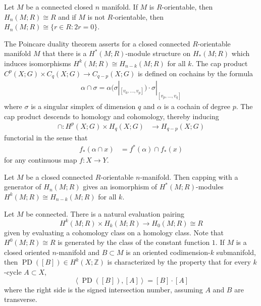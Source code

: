 \documentclass[12pt]{article}
\begin{document}
\begin{theorem}
    Let $M$ be a connected closed $n$ manifold. If $M$ is $R$-orientable, then $H_n(M;R)\cong R$ and if $M$ is not $R$-orientable, then $H_n(M;R)\cong \{r\in R: 2r=0\}$.
\end{theorem}

The Poincare duality theorem asserts for a closed connected $R$-orientable manifold $M$ that there is a $H^*(M;R)$-module structure on $H_*(M;R)$ which induces isomorphisms $H^k(M;R)\cong H_{n-k}(M;R)$ for all $k$. The cap product $C^p(X;G)\times C_q(X;G) \to C_{q-p}(X;G)$ is defined on cochains by the formula \begin{align*}
    \alpha\cap \sigma = \alpha(\sigma|_{[v_0,\ldots,v_p]})\cdot \sigma|_{[v_p,\ldots,v_q]}
\end{align*} where $\sigma$ is a singular simplex of dimension $q$ and $\alpha$ is a cochain of degree $p$. The cap product descends to homology and cohomology, thereby inducing \begin{align*}
    \cap : H^p(X;G)\times H_q(X;G) & \to H_{q-p}(X;G) 
\end{align*} functorial in the sense that \begin{align*}
    f_*(\alpha\cap x) & = f^*(\alpha)\cap f_*(x)
\end{align*} for any continuous map $f:X\to Y$. 

\begin{theorem}
     Let $M$ be a closed connected $R$-orientable $n$-manifold. Then capping with a generator of $H_n(M;R)$ gives an isomorphism of $H^*(M;R)$-modules $H^k(M;R)\cong H_{n-k}(M;R)$ for all $k$.
\end{theorem}

Let $M$ be connected. There is a natural evaluation pairing \[H^k(M;R)\times H_{k}(M;R) \to H_0(M;R)\cong R\] given by evaluating a cohomology class on a homology class. Note that $H^0(M;R)\cong R$ is generated by the class of the constant function $1$. If $M$ is a closed oriented $n$-manifold and $B\subset M$ is an oriented codimension-$k$ submanifold, then $\operatorname{PD}([B])\in H^k(X;\mathbb Z)$ is characterized by the property that for every $k$-cycle $A\subset X$,
\[\left\langle \operatorname{PD}([B]),[A]\right\rangle
=
[B]\cdot [A]\]
where the right side is the signed intersection number, assuming $A$ and $B$ are transverse.
\end{document}
